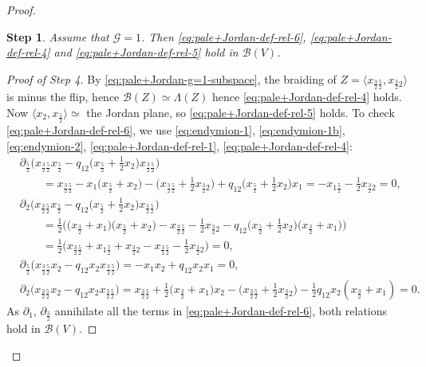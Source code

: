 \documentclass[10pt,a4paper]{amsart}
\numberwithin{equation}{section}
\newtheorem{stepiv}{Step}
\newcommand{\toba}{\mathscr B}
\newcommand{\ghost}{\mathscr{G}}
\newcommand{\tresdos}{\frac{3}{2}}
\newcommand{\cincodos}{\frac{5}{2}}
\begin{document}
\begin{proof}
\begin{stepiv}
Assume that $\ghost = 1$. Then \eqref{eq:pale+Jordan-def-rel-6}, \eqref{eq:pale+Jordan-def-rel-4} and \eqref{eq:pale+Jordan-def-rel-5}
hold in $\toba(V)$.
\end{stepiv}

\begin{proof}[Proof of Step 4]
By \eqref{eq:pale+Jordan-g=1-subspace}, the braiding of $Z = \big\langle x_{\tresdos\cincodos},x_{\tresdos2}\big\rangle$ is minus the flip, hence
$\toba(Z) \simeq \Lambda(Z)$ hence \eqref{eq:pale+Jordan-def-rel-4} holds.
Now $\langle x_{2}, x_{\cincodos}\rangle \simeq $ the Jordan plane, so \eqref{eq:pale+Jordan-def-rel-5} holds.
To check \eqref{eq:pale+Jordan-def-rel-6}, we use \eqref{eq:endymion-1}, \eqref{eq:endymion-1b}, \eqref{eq:endymion-2}, \eqref{eq:pale+Jordan-def-rel-1}, \eqref{eq:pale+Jordan-def-rel-4}:
\begin{align*}
&\partial_{\cincodos} \big(x_{\tresdos\cincodos}x_{\cincodos}-q_{12}\big(x_{\cincodos}+\tfrac{1}{2}x_{2}\big)x_{\tresdos\cincodos}\big) \\
&\qquad{}=x_{\tresdos\cincodos}-x_1\big(x_{\cincodos}+x_2\big)
-\big(x_{\tresdos\cincodos}+\tfrac{1}{2}x_{\tresdos2}\big)
+q_{12}\big(x_{\cincodos}+\tfrac{1}{2}x_{2}\big)x_1
= -x_{1\cincodos}-\tfrac{1}{2}x_{\tresdos2}=0,
\\
&\partial_{2} \big(x_{\tresdos\cincodos}x_{\cincodos}-q_{12}\big(x_{\cincodos}+\tfrac{1}{2}x_{2}\big)x_{\tresdos\cincodos}\big)
\\
&\qquad{}=\tfrac{1}{2}\big(\big(x_{\tresdos}+x_1\big)\big(x_{\cincodos}+x_2\big)
-x_{\tresdos\cincodos}-\tfrac{1}{2}x_{\tresdos2}
-q_{12}\big(x_{\cincodos}+\tfrac{1}{2}x_{2}\big)\big(x_{\tresdos}+x_1\big)\big)
\\
&\qquad{}
=\tfrac{1}{2}\big(x_{\tresdos\cincodos}+x_{1\cincodos}+x_{\tresdos2}
-x_{\tresdos\cincodos}-\tfrac{1}{2}x_{\tresdos2} \big)=0,
\\
&\partial_{\cincodos} \big(x_{\tresdos\cincodos}x_2-q_{12}x_2x_{\tresdos\cincodos}\big) =
-x_1x_2+q_{12}x_2x_1=0,
\\
& \partial_{2} \big(x_{\tresdos\cincodos}x_2-q_{12}x_2x_{\tresdos\cincodos}\big) =
x_{\tresdos\cincodos}
+\tfrac{1}{2}\big(x_{\tresdos}+x_1\big) x_2
-\big(x_{\tresdos\cincodos}+\tfrac{1}{2}x_{\tresdos2}\big)
-\tfrac{1}{2}q_{12}x_2(x_{\tresdos}+x_1)=0.
\end{align*}
As $\partial_1$, $\partial_{\tresdos}$ annihilate all the terms in \eqref{eq:pale+Jordan-def-rel-6}, both relations hold in $\toba(V)$.
\end{proof}


\end{proof}
\end{document}
